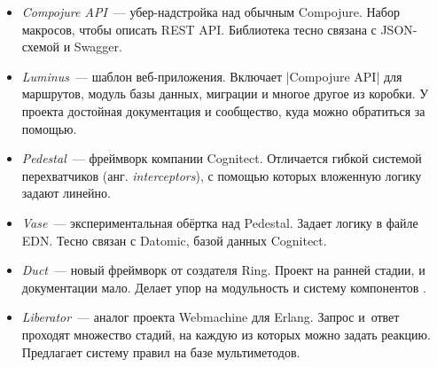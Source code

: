 \begin{itemize}


\item
  \emph{Compojure API}~---
  убер-надстройка над обычным Compojure. Набор макросов, чтобы описать REST
  API. Библиотека тесно связана с JSON-схемой и Swagger.


\item
  \emph{Luminus}~--- шаблон
  веб-приложения. Включает \spverb|Compojure API| для маршрутов, модуль базы
  данных, миграции и многое другое из коробки. У проекта достойная документация
  и сообщество, куда можно обратиться за помощью.


\item
  \emph{Pedestal}~--- фреймворк
  компании Cognitect. Отличается гибкой системой перехватчиков
  (анг. \emph{interceptors}), с помощью которых вложенную логику задают линейно.


\item
  \emph{Vase}~---
  экспериментальная об\"{е}ртка над Pedestal. Задает логику в файле EDN. Тесно
  связан с Datomic, базой данных Cognitect.


\item
  \emph{Duct}~--- новый
  фреймворк от создателя Ring. Проект на ранней стадии, и документации
  мало. Делает упор на модульность и систему компонентов .


\item
  \emph{Liberator}~---
  аналог проекта Webmachine для Erlang. Запрос и~ответ проходят множество
  стадий, на каждую из которых можно задать реакцию. Предлагает систему правил
  на базе мультиметодов.

\end{itemize}


